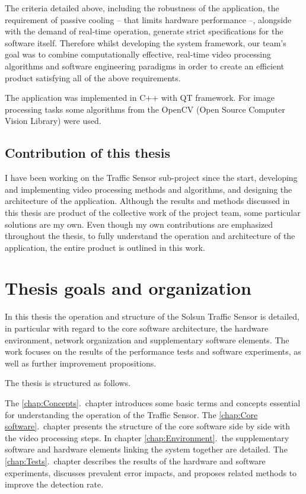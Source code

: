 The criteria detailed above, including the robustness of the application, the requirement of passive cooling -- that limits hardware performance --, alongside with the demand of real-time operation, generate strict specifications for the software itself.
Therefore whilst developing the system framework, our team's goal was to combine computationally effective, real-time video processing algorithms and software engineering paradigms in order to create an efficient product satisfying all of the above requirements.

The application was implemented in C++ with QT framework.
For image processing tasks some algorithms from the OpenCV (Open Source Computer Vision Library) were used.

\subsection{Contribution of this thesis}

I have been working on the Traffic Sensor sub-project since the start, developing and implementing video processing methods and algorithms, and designing the architecture of the application.
Although the results and methods discussed in this thesis are product of the collective work of the project team, some particular solutions are my own. 
Even though my own contributions are emphasized throughout the thesis, to fully understand the operation and architecture of the application, the entire product is outlined in this work.

\section{Thesis goals and organization}
In this thesis the operation and structure of the Solsun Traffic Sensor is detailed, in particular with regard to the core software architecture, the hardware environment, network organization and supplementary software elements.
The work focuses on the results of the performance tests and software experiments, as well as further improvement propositions.

The thesis is structured as follows.

The \ref{chap:Concepts}.~chapter introduces some basic terms and concepts essential for understanding the operation of the Traffic Sensor. 
The \ref{chap:Core software}.~chapter presents the structure of the core software side by side with the video processing steps.
In chapter \ref{chap:Environment}.~the supplementary software and hardware elements linking the system together are detailed.
The \ref{chap:Tests}.~chapter describes the results of the hardware and software experiments, discusses prevalent error impacts, and proposes related methods to improve the detection rate.
